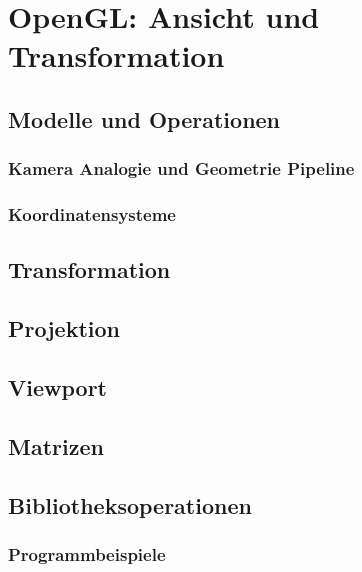\chapter{OpenGL: Ansicht und Transformation}

\section{Modelle und Operationen}

\subsection{Kamera Analogie und Geometrie Pipeline}
\subsection{Koordinatensysteme}

\section{Transformation}

\section{Projektion}

\section{Viewport}

\section{Matrizen}
\section{Bibliotheksoperationen}

\subsection{Programmbeispiele}


